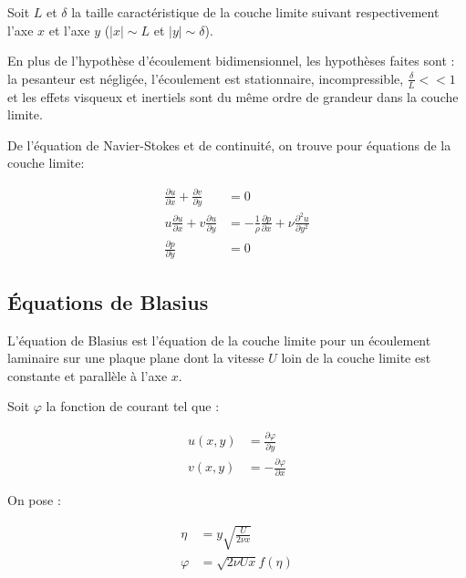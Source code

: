 Soit $L$ et $\delta$ la taille caractéristique de la couche limite suivant respectivement l'axe $x$ et l'axe $y$ ($\left| x \right| \sim L$ et $\left| y \right| \sim \delta$).

En plus de l'hypothèse d'écoulement bidimensionnel, les hypothèses faites sont : la pesanteur est négligée, l'écoulement est stationnaire, incompressible, $\frac{\delta}{L} << 1$ et les effets visqueux et inertiels sont du même ordre de grandeur dans la couche limite.


De l'équation de Navier-Stokes et de continuité, on trouve pour équations de la couche limite:

\begin{align}	
	\frac{\partial u}{\partial x} 
	+
	\frac{\partial v}{\partial y} 
	&= 0 \\
	u\frac{\partial u}{\partial x} + 
	v\frac{\partial u}{\partial y} 
	&= - \frac{1}{\rho}
	\frac{\partial p}{\partial  x} +
	\nu
	\frac{\partial^{2} u}{\partial  y^{2}} \\
	\frac{\partial p}{\partial y} 
	&= 0
\end{align}
\subsection{Équations de Blasius}
L'équation de Blasius est l'équation de la couche limite pour un écoulement laminaire sur une plaque plane dont la vitesse $U$ loin de la couche limite est constante et parallèle à l'axe $x$.

Soit $\varphi$ la fonction de courant tel que :

\begin{align*}
	u(x,y) &= 
	\frac{\partial \varphi}{\partial y} \\
	v(x,y) &= - 
	\frac{\partial \varphi}{\partial x}
\end{align*}

On pose :

\begin{align*}
	\eta &= y \sqrt{\frac{U}{2\nu x }} \\
	\varphi &= \sqrt{2\nu U x} f(\eta)
\end{align*}



